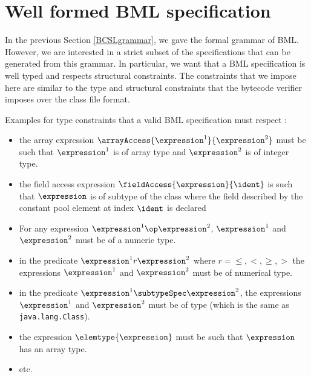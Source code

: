 
\newcommand{\getType}{\mbox{\rm\textsf{getType}}}
\newcommand{\constType}{\mbox{\rm\textsf{constType}}}
\newcommand{\getClass}{\mbox{\rm\textsf{getClass}}}
\newcommand{\application}{\mbox{\rm\textbf{CLS}}}
 
\section{Well formed BML specification}
In the previous Section \ref{BCSLgrammar}, we gave the formal grammar of BML.
However, we are interested in a strict subset of 
the specifications that can be generated from this grammar. In particular, we want that a
BML specification is well typed and respects structural constraints.
The constraints that we impose here are similar to the type and structural constraints
that the bytecode verifier imposes over the class file format.

Examples for type constraints that  a valid BML specification must respect : 
\begin{itemize}
    \item  the array expression $\arrayAccess{\expression^1}{\expression^2}$ must be such that 
$\expression^1$ is of array type and $\expression^2$  is of integer type.

    \item the field access expression  $\fieldAccess{\expression}{\ident}$ is such that $\expression$ is of subtype
    of the class where the field described by the constant pool element at index $\ident$ is declared
    \item For any expression $ \expression^1 \op \expression^2$,  $ \expression^1$ and $ \expression^2$ must be of
          a numeric type.
    
    \item in the predicate $\expression^1 r \expression^2$ where $r =  \leq,<,\geq, >$  the expressions  $\expression^1$ and 
          $\expression^2$ must be of numerical type.

     \item  in the predicate $\expression^1  \subtypeSpec \expression^2$, the expressions $\expression^1$
            and  $\expression^2$ must be of type \TYPE (which is the same as \texttt{java.lang.Class}).

     \item the expression $\elemtype{\expression}$ must be such that $\expression$ has an array type.
	    
     \item  etc.  	   

	  
 \end{itemize}

